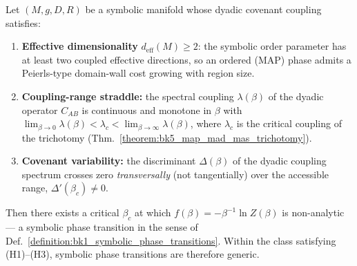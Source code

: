 \begin{theorem}
\label{theorem:bk1_conditional_genericity_of_symbolic_phase_transitions}
Let $(M,g,D,R)$ be a symbolic manifold whose dyadic covenant coupling satisfies:
\begin{enumerate}[label=\textbf{(H\arabic*)}]
    \item \textbf{Effective dimensionality} $d_{\mathrm{eff}}(M)\ge 2$: the symbolic
    order parameter has at least two coupled effective directions, so an ordered
    (MAP) phase admits a Peierls-type domain-wall cost growing with region size.
    \item \textbf{Coupling-range straddle:} the spectral coupling $\lambda(\beta)$
    of the dyadic operator $C_{AB}$ is continuous and monotone in $\beta$ with
    $\lim_{\beta\to 0}\lambda(\beta)<\lambda_c<\lim_{\beta\to\infty}\lambda(\beta)$,
    where $\lambda_c$ is the critical coupling of the trichotomy
    (Thm.~\ref{theorem:bk5_map_mad_mas_trichotomy}).
    \item \textbf{Covenant variability:} the discriminant $\Delta(\beta)$ of the
    dyadic coupling spectrum crosses zero \emph{transversally} (not tangentially)
    over the accessible range, $\Delta'(\beta_c)\ne 0$.
\end{enumerate}
Then there exists a critical $\beta_c$ at which $f(\beta)=-\beta^{-1}\ln Z(\beta)$
is non-analytic --- a symbolic phase transition in the sense of
Def.~\ref{definition:bk1_symbolic_phase_transitions}. Within the class satisfying
(H1)--(H3), symbolic phase transitions are therefore generic.
\end{theorem}


